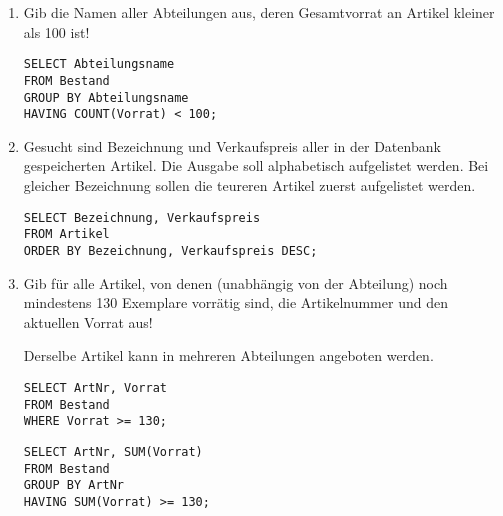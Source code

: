 \documentclass{lehramt-informatik}
\begin{document}
\begin{enumerate}

\item Gib die Namen aller Abteilungen aus, deren Gesamtvorrat an Artikel
kleiner als 100 ist!

\begin{antwort}[muster]
\begin{verbatim}
SELECT Abteilungsname
FROM Bestand
GROUP BY Abteilungsname
HAVING COUNT(Vorrat) < 100;
\end{verbatim}
\end{antwort}


\item Gesucht sind Bezeichnung und Verkaufspreis aller in der Datenbank
gespeicherten Artikel. Die Ausgabe soll alphabetisch aufgelistet werden.
Bei gleicher Bezeichnung sollen die teureren Artikel zuerst aufgelistet
werden.

\begin{antwort}[muster]
\begin{verbatim}
SELECT Bezeichnung, Verkaufspreis
FROM Artikel
ORDER BY Bezeichnung, Verkaufspreis DESC;
\end{verbatim}
\end{antwort}


\item Gib für alle Artikel, von denen (unabhängig von der Abteilung)
noch mindestens 130 Exemplare vorrätig sind, die Artikelnummer und den
aktuellen Vorrat aus!

\begin{antwort}[falsch]
Derselbe Artikel kann in mehreren Abteilungen angeboten werden.
\begin{verbatim}
SELECT ArtNr, Vorrat
FROM Bestand
WHERE Vorrat >= 130;
\end{verbatim}
\end{antwort}

\begin{antwort}[muster]
\begin{verbatim}
SELECT ArtNr, SUM(Vorrat)
FROM Bestand
GROUP BY ArtNr
HAVING SUM(Vorrat) >= 130;
\end{verbatim}
\end{antwort}

\end{enumerate}

%
\end{document}
